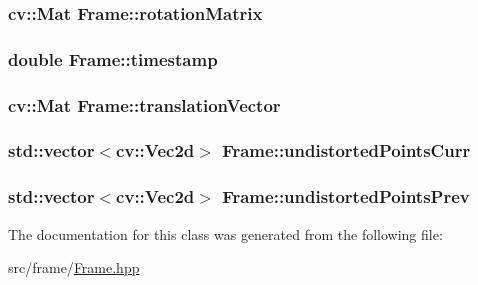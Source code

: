 \subsubsection[{\texorpdfstring{rotation\+Matrix}{rotationMatrix}}]{\setlength{\rightskip}{0pt plus 5cm}cv\+::\+Mat Frame\+::rotation\+Matrix}\hypertarget{classFrame_ae6b2810e1e9d8cc8a5ba7dff9378b019}{}\label{classFrame_ae6b2810e1e9d8cc8a5ba7dff9378b019}
\subsubsection[{\texorpdfstring{timestamp}{timestamp}}]{\setlength{\rightskip}{0pt plus 5cm}double Frame\+::timestamp}\hypertarget{classFrame_a360891231ed2b244f6caf3cfc8c16fb5}{}\label{classFrame_a360891231ed2b244f6caf3cfc8c16fb5}
\subsubsection[{\texorpdfstring{translation\+Vector}{translationVector}}]{\setlength{\rightskip}{0pt plus 5cm}cv\+::\+Mat Frame\+::translation\+Vector}\hypertarget{classFrame_a5635d2b68ffd5456f6e7ad0f54d1ba29}{}\label{classFrame_a5635d2b68ffd5456f6e7ad0f54d1ba29}
\subsubsection[{\texorpdfstring{undistorted\+Points\+Curr}{undistortedPointsCurr}}]{\setlength{\rightskip}{0pt plus 5cm}std\+::vector$<$cv\+::\+Vec2d$>$ Frame\+::undistorted\+Points\+Curr}\hypertarget{classFrame_a81aae40549c6b5548cf63d050f7a19e3}{}\label{classFrame_a81aae40549c6b5548cf63d050f7a19e3}
\subsubsection[{\texorpdfstring{undistorted\+Points\+Prev}{undistortedPointsPrev}}]{\setlength{\rightskip}{0pt plus 5cm}std\+::vector$<$cv\+::\+Vec2d$>$ Frame\+::undistorted\+Points\+Prev}\hypertarget{classFrame_a9efe87123d623bfe06327036ee59e423}{}\label{classFrame_a9efe87123d623bfe06327036ee59e423}


The documentation for this class was generated from the following file\+:\begin{DoxyCompactItemize}
\item 
src/frame/\hyperlink{Frame_8hpp}{Frame.\+hpp}\end{DoxyCompactItemize}
